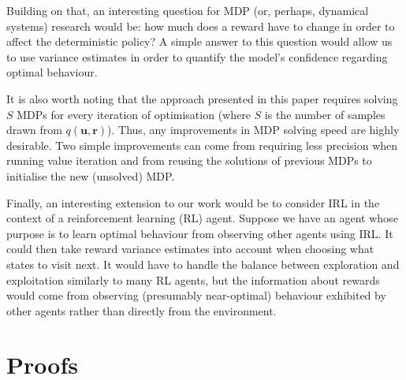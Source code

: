 \documentclass{mpaper}
\newcommand{\approximation}{q(\mathbf{u}, \mathbf{r})}
\begin{document}
Building on that, an interesting question for MDP (or, perhaps, dynamical
systems) research would be: how much does a reward have to change in order to
affect the deterministic policy? A simple answer to this question would allow us
to use variance estimates in order to quantify the model's confidence regarding
optimal behaviour.

It is also worth noting that the approach presented in this paper requires solving
$S$ MDPs for every iteration of optimisation (where $S$ is the
number of samples drawn from $\approximation$). Thus, any improvements in MDP
solving speed are highly desirable. Two simple improvements can come from
requiring less precision when running value iteration and from reusing the
solutions of previous MDPs to initialise the new (unsolved) MDP.

Finally, an interesting extension to our work would be to consider IRL in the
context of a reinforcement learning (RL) agent. Suppose we have an agent whose
purpose is to learn optimal behaviour from observing other agents using IRL. It
could then take reward variance estimates into account when choosing what states
to visit next. It would have to handle the balance between exploration and
exploitation similarly to many RL agents, but the information about rewards
would come from observing (presumably near-optimal) behaviour exhibited by other
agents rather than directly from the environment.




\appendix
\section{Proofs} \label{appendix:proofs}
\end{document}
